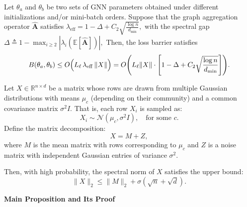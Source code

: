 \begin{corollary}
\label{cor:loss-barrier-bound-simplified}
Let \(\theta_a\) and \(\theta_b\) be two sets of GNN parameters obtained under different initializations and/or mini-batch orders. Suppose that the graph aggregation operator \(\hat{\mathbf{A}}\) satisfies
\(
\lambda_{\mathrm{eff}} = 1 - \Delta + C_2 \sqrt{\frac{\log n}{d_{\min}}},
\)
with the spectral gap
\(
\Delta \triangleq 1 - \max_{i\ge 2} |\lambda_i(\mathbb{E}[\hat{\mathbf{A}}])|,
\)
Then, the loss barrier satisfies
\[
B(\theta_a,\theta_b) \le O\Bigl( L_\ell\, \lambda_{\mathrm{eff}}\, \|X\| \Bigr)
= O\Biggl( L_\ell\|X\|\cdot \left[1 - \Delta + C_2 \sqrt{\frac{\log n}{d_{\min}}}\right]  \Biggr).
\]
\end{corollary}
\begin{lemma}
Let $X \in \mathbb{R}^{n \times d}$ be a matrix whose rows are drawn from multiple Gaussian distributions with means $\mu_c$ (depending on their community) and a common covariance matrix $\sigma^2 I$. That is, each row $X_i$ is sampled as:
\[
X_i \sim \mathcal{N}(\mu_c, \sigma^2 I), \quad \text{for some } c.
\]
Define the matrix decomposition:
\[
X = M + Z,
\]
where $M$ is the mean matrix with rows corresponding to $\mu_c$ and $Z$ is a noise matrix with independent Gaussian entries of variance $\sigma^2$. 

Then, with high probability, the spectral norm of $X$ satisfies the upper bound:
\[
\|X\|_2 \leq \|M\|_2 + \sigma (\sqrt{n} + \sqrt{d}).
\]
\end{lemma}
\noindent\textbf{Main Proposition and Its Proof}

